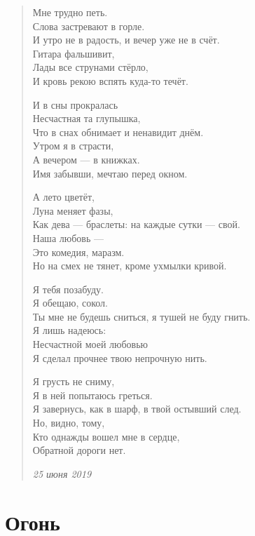 \documentclass[a4paper,12pt,fleqn]{book}\usepackage{polyglossia}\setdefaultlanguage[babelshorthands=true]{russian}\setotherlanguage{english}\defaultfontfeatures{Ligatures=TeX,Mapping=tex-text}\usepackage{xcolor}\newcommand{\ml}[3]{#2}
\begin{document}
\begin{verse}
Мне трудно петь.\\
Слова застревают в горле.\\
И утро не в радость, и вечер уже не в счёт.\\
Гитара фальшивит,\\
Лады все струнами стёрло,\\
И кровь рекою вспять куда-то течёт.

И в сны прокралась\\
Несчастная та глупышка,\\
Что в снах обнимает и ненавидит днём.\\
Утром я в страсти,\\
А вечером --- в книжках.\\
Имя забывши, мечтаю перед окном.

А лето цветёт,\\
Луна меняет фазы,\\
Как дева --- браслеты: на каждые сутки --- свой.\\
Наша любовь ---\\
Это комедия, маразм.\\
Но на смех не тянет, кроме ухмылки кривой.

Я тебя позабуду.\\
Я обещаю, сокол.\\
Ты мне не будешь сниться, я тушей не буду гнить.\\
Я лишь надеюсь:\\
Несчастной моей любовью\\
Я сделал прочнее твою непрочную нить.

Я грусть не сниму,\\
Я в ней попытаюсь греться.\\
Я завернусь, как в шарф, в твой остывший след.\\
Но, видно, тому,\\
Кто однажды вошел мне в сердце,\\
Обратной дороги нет.

\emph{25 июня 2019}
\end{verse}
\newpage

\section{Огонь}
\end{document}
